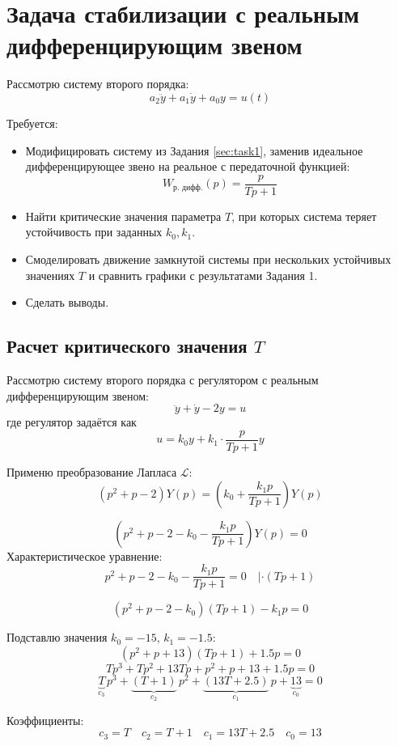 \documentclass[a4paper,12pt]{article}
\begin{document}
	\newpage
	\section{Задача стабилизации с реальным дифференцирующим звеном}
	
	Рассмотрю систему второго порядка:
	\[
	a_2 \ddot{y} + a_1 \dot{y} + a_0 y = u(t)
	\]
	
	Требуется:
	
	\begin{itemize}
		\item Модифицировать систему из Задания \ref{sec:task1}, заменив идеальное дифференцирующее звено на реальное с передаточной функцией:
		\[
		W_{\text{р. дифф.}}(p) = \frac{p}{T p + 1}
		\]
		\item Найти критические значения параметра \( T \), при которых система теряет устойчивость при заданных \( k_0, k_1 \).
		\item Смоделировать движение замкнутой системы при нескольких устойчивых значениях \( T \) и сравнить графики с результатами Задания 1.
		\item Сделать выводы.
	\end{itemize}
	
	\subsection{Расчет критического значения \(T\)}
	
	Рассмотрю систему второго порядка с регулятором с реальным дифференцирующим звеном:
	\[
	\ddot{y} + \dot{y} - 2 y = u
	\]
	где регулятор задаётся как
	\[
	u = k_0 y + k_1 \cdot \frac{p}{T p + 1} y
	\]
	
	Применю преобразование Лапласа \( \mathcal{L} \):
	\[
	(p^2 + p - 2) Y(p) = \left(k_0 + \frac{k_1 p}{T p + 1}\right) Y(p)
	\]
	
	\[
	\left( p^2 + p - 2 - k_0 - \frac{k_1 p}{T p + 1} \right) Y(p) = 0
	\]
	Характеристическое уравнение:
	\[
	p^2 + p - 2 - k_0 - \frac{k_1 p}{T p + 1} = 0 \quad | \cdot (Tp+1)
	\]
	
	\[
	(p^2 + p - 2 - k_0)(T p + 1) - k_1 p = 0
	\]
	
	Подставлю значения \( k_0 = -15 \), \( k_1 = -1.5 \):
	\[
	(p^2 + p + 13)(T p + 1) + 1.5 p = 0
	\]
	\[
	T p^3 + T p^2 + 13 T p + p^2 + p + 13 + 1.5 p = 0
	\]
	\[
	\underbrace{T}_{c_3} \, p^3 + \underbrace{(T + 1)}_{c_2} \, p^2 + \underbrace{(13 T + 2.5)}_{c_1} \, p + \underbrace{13}_{c_0} = 0
	\]
	
	
	Коэффициенты:
	\[
	c_3 = T \quad c_2 = T + 1 \quad c_1 = 13 T + 2.5 \quad c_0 = 13
	\]
	
\end{document}
